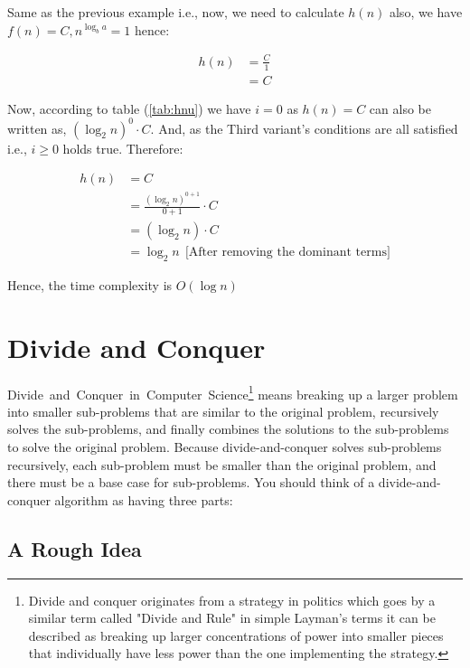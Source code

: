 \documentclass[a4paper,12pt]{article}
\theoremstyle{definition}
\begin{document}
    \noindent
    Same as the previous example i.e., now, we need to calculate $h(n)$ also, we have $f(n) = C, n^{\log_b a} = 1$
    hence:

    \begin{align*}
        h(n) & = \frac{C}{1} \\
        & = C
    \end{align*}

    \noindent
    Now, according to table (\ref{tab:hnu}) we have $i = 0$ as $h(n) = C$ can also be written as,
    $(\log_2 n)^0 \cdot C$.
    And, as the Third variant's conditions are all satisfied i.e., $i \geq 0$ holds true.
    Therefore:

    \begin{align*}
        h(n) & = C                                                      \\
        & = \frac{(\log_2 n)^{0+1}}{0 + 1} \cdot C                 \\
        & = (\log_2 n) \cdot C                                     \\
        & = \log_2 n\ \ \text{[After removing the dominant terms]}
    \end{align*}

    \noindent
    Hence, the time complexity is $O(\log n)$


    \section{Divide and Conquer}

    Divide~and~Conquer~in~Computer~Science\footnote{
        Divide and conquer originates from a strategy in politics which goes by a similar term called
        "Divide and Rule" in simple Layman's terms it can be described as breaking up larger concentrations
        of power into smaller pieces that individually have less power than the one implementing the strategy.
    }
    means breaking up a larger problem into smaller sub-problems that are similar to the original problem,
    recursively solves the sub-problems, and finally combines the solutions to the sub-problems to solve
    the original problem.
    Because divide-and-conquer solves sub-problems recursively, each sub-problem must be smaller than the
    original problem, and there must be a base case for sub-problems.
    You should think of a divide-and-conquer algorithm as having three parts:

    \subsection{A Rough Idea}
\end{document}
